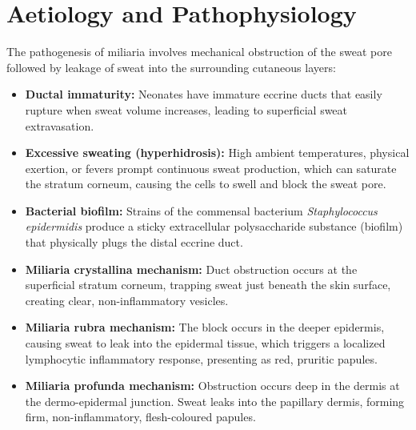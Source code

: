 \section*{Aetiology and Pathophysiology}
The pathogenesis of miliaria involves mechanical obstruction of the sweat pore followed by leakage of sweat into the surrounding cutaneous layers:
\begin{itemize}
    \item \textbf{Ductal immaturity:} Neonates have immature eccrine ducts that easily rupture when sweat volume increases, leading to superficial sweat extravasation.
    \item \textbf{Excessive sweating (hyperhidrosis):} High ambient temperatures, physical exertion, or fevers prompt continuous sweat production, which can saturate the stratum corneum, causing the cells to swell and block the sweat pore.
    \item \textbf{Bacterial biofilm:} Strains of the commensal bacterium \textit{Staphylococcus epidermidis} produce a sticky extracellular polysaccharide substance (biofilm) that physically plugs the distal eccrine duct.
    \item \textbf{Miliaria crystallina mechanism:} Duct obstruction occurs at the superficial stratum corneum, trapping sweat just beneath the skin surface, creating clear, non-inflammatory vesicles.
    \item \textbf{Miliaria rubra mechanism:} The block occurs in the deeper epidermis, causing sweat to leak into the epidermal tissue, which triggers a localized lymphocytic inflammatory response, presenting as red, pruritic papules.
    \item \textbf{Miliaria profunda mechanism:} Obstruction occurs deep in the dermis at the dermo-epidermal junction. Sweat leaks into the papillary dermis, forming firm, non-inflammatory, flesh-coloured papules.
\end{itemize}

